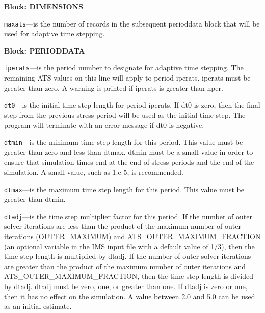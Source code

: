 
\item \textbf{Block: DIMENSIONS}

\begin{description}
\item \texttt{maxats}---is the number of records in the subsequent perioddata block that will be used for adaptive time stepping.

\end{description}
\item \textbf{Block: PERIODDATA}

\begin{description}
\item \texttt{iperats}---is the period number to designate for adaptive time stepping.  The remaining ATS values on this line will apply to period iperats.  iperats must be greater than zero.  A warning is printed if iperats is greater than nper.

\item \texttt{dt0}---is the initial time step length for period iperats.  If dt0 is zero, then the final step from the previous stress period will be used as the initial time step.  The program will terminate with an error message if dt0 is negative.

\item \texttt{dtmin}---is the minimum time step length for this period.  This value must be greater than zero and less than dtmax.  dtmin must be a small value in order to ensure that simulation times end at the end of stress periods and the end of the simulation.  A small value, such as 1.e-5, is recommended.

\item \texttt{dtmax}---is the maximum time step length for this period.  This value must be greater than dtmin.

\item \texttt{dtadj}---is the time step multiplier factor for this period.  If the number of outer solver iterations are less than the product of the maximum number of outer iterations (OUTER\_MAXIMUM) and ATS\_OUTER\_MAXIMUM\_FRACTION (an optional variable in the IMS input file with a default value of 1/3), then the time step length is multiplied by dtadj.  If the number of outer solver iterations are greater than the product of the maximum number of outer iterations and ATS\_OUTER\_MAXIMUM\_FRACTION, then the time step length is divided by dtadj.  dtadj must be zero, one, or greater than one.  If dtadj is zero or one, then it has no effect on the simulation.  A value between 2.0 and 5.0 can be used as an initial estimate.


\end{description}
